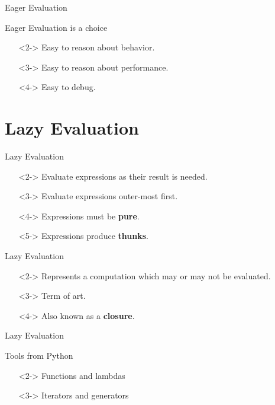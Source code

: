 \documentclass{beamer}
\begin{document}
\begin{frame}{Eager Evaluation}
  \begin{block}{Eager Evaluation is a choice}
    \begin{itemize}
    \item[]<2-> Easy to reason about behavior.
    \item[]<3-> Easy to reason about performance.
    \item[]<4-> Easy to debug.
    \end{itemize}
  \end{block}
\end{frame}

\section{Lazy Evaluation}

\begin{frame}{Lazy Evaluation}
  \begin{definition}
    \begin{itemize}
    \item[]<2-> Evaluate expressions as their result is needed.
    \item[]<3-> Evaluate expressions outer-most first.
    \item[]<4-> Expressions must be \textbf{pure}.
    \item[]<5-> Expressions produce \textbf{thunks}.
    \end{itemize}
  \end{definition}
\end{frame}

\begin{frame}{Lazy Evaluation}
  \begin{definition}[Thunk]
    \begin{itemize}
    \item[]<2-> Represents a computation which may or may not be evaluated.
    \item[]<3-> Term of art.
    \item[]<4-> Also known as a \textbf{closure}.
    \end{itemize}
  \end{definition}
\end{frame}

\begin{frame}{Lazy Evaluation}
  \begin{block}{Tools from Python}
    \begin{itemize}
      \item[]<2-> Functions and lambdas
      \item[]<3-> Iterators and generators
    \end{itemize}
  \end{block}
\end{frame}
\end{document}

